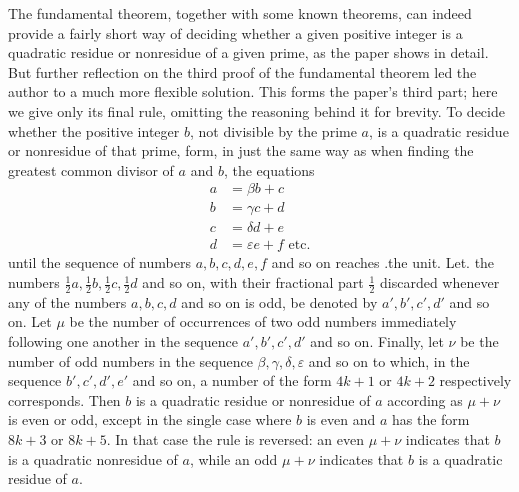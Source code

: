\clearpage{}%
The fundamental theorem, together with some known theorems, can indeed provide a fairly short way of deciding whether a given positive integer is a quadratic residue or nonresidue of a given prime, as the paper shows in detail. But further reflection on the third proof of the fundamental theorem led the author to a much more flexible solution. This forms the paper's third part; here we give only its final rule, omitting the reasoning behind it for brevity. To decide whether the positive integer $b$, not divisible by the prime $a$, is a quadratic residue or nonresidue of that prime, form, in just the same way as when finding the greatest common divisor of $a$ and $b$, the equations
\[
\begin{aligned}
a&=\beta b+c\\
b&=\gamma c+d\\
c&=\delta d+e\\
d&=\varepsilon e+f\text{ etc.}
\end{aligned}
\]
until the sequence of numbers $a,b,c,d,e,f$ and so on reaches .the unit. Let. the numbers $\frac12a,\frac12b,\frac12c,\frac12d$ and so on, with their fractional part $\frac12$ discarded whenever any of the numbers $a,b,c,d$ and so on is odd, be denoted by $a',b',c',d'$ and so on. Let $\mu$ be the number of occurrences of two odd numbers immediately following one another in the sequence $a',b',c',d'$ and so on. Finally, let $\nu$ be the number of odd numbers in the sequence $\beta,\gamma,\delta,\varepsilon$ and so on to which, in the sequence $b',c',d',e'$ and so on, a number of the form $4k+1$ or $4k+2$ respectively corresponds. Then $b$ is a quadratic residue or nonresidue of $a$ according as $\mu+\nu$ is even or odd, except in the single case where $b$ is even and $a$ has the form $8k+3$ or $8k+5$. In that case the rule is reversed: an even $\mu+\nu$ indicates that $b$ is a quadratic nonresidue of $a$, while an odd $\mu+\nu$ indicates that $b$ is a quadratic residue of $a$.

